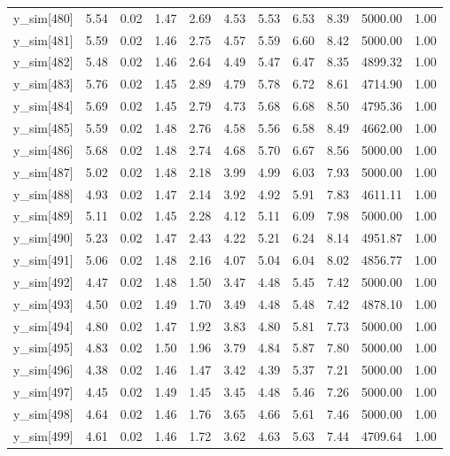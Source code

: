 \begin{table}[ht]
\begin{tabular}{rrrrrrrrrrr}
  y\_sim[480] & 5.54 & 0.02 & 1.47 & 2.69 & 4.53 & 5.53 & 6.53 & 8.39 & 5000.00 & 1.00 \\ 
  y\_sim[481] & 5.59 & 0.02 & 1.46 & 2.75 & 4.57 & 5.59 & 6.60 & 8.42 & 5000.00 & 1.00 \\ 
  y\_sim[482] & 5.48 & 0.02 & 1.46 & 2.64 & 4.49 & 5.47 & 6.47 & 8.35 & 4899.32 & 1.00 \\ 
  y\_sim[483] & 5.76 & 0.02 & 1.45 & 2.89 & 4.79 & 5.78 & 6.72 & 8.61 & 4714.90 & 1.00 \\ 
  y\_sim[484] & 5.69 & 0.02 & 1.45 & 2.79 & 4.73 & 5.68 & 6.68 & 8.50 & 4795.36 & 1.00 \\ 
  y\_sim[485] & 5.59 & 0.02 & 1.48 & 2.76 & 4.58 & 5.56 & 6.58 & 8.49 & 4662.00 & 1.00 \\ 
  y\_sim[486] & 5.68 & 0.02 & 1.48 & 2.74 & 4.68 & 5.70 & 6.67 & 8.56 & 5000.00 & 1.00 \\ 
  y\_sim[487] & 5.02 & 0.02 & 1.48 & 2.18 & 3.99 & 4.99 & 6.03 & 7.93 & 5000.00 & 1.00 \\ 
  y\_sim[488] & 4.93 & 0.02 & 1.47 & 2.14 & 3.92 & 4.92 & 5.91 & 7.83 & 4611.11 & 1.00 \\ 
  y\_sim[489] & 5.11 & 0.02 & 1.45 & 2.28 & 4.12 & 5.11 & 6.09 & 7.98 & 5000.00 & 1.00 \\ 
  y\_sim[490] & 5.23 & 0.02 & 1.47 & 2.43 & 4.22 & 5.21 & 6.24 & 8.14 & 4951.87 & 1.00 \\ 
  y\_sim[491] & 5.06 & 0.02 & 1.48 & 2.16 & 4.07 & 5.04 & 6.04 & 8.02 & 4856.77 & 1.00 \\ 
  y\_sim[492] & 4.47 & 0.02 & 1.48 & 1.50 & 3.47 & 4.48 & 5.45 & 7.42 & 5000.00 & 1.00 \\ 
  y\_sim[493] & 4.50 & 0.02 & 1.49 & 1.70 & 3.49 & 4.48 & 5.48 & 7.42 & 4878.10 & 1.00 \\ 
  y\_sim[494] & 4.80 & 0.02 & 1.47 & 1.92 & 3.83 & 4.80 & 5.81 & 7.73 & 5000.00 & 1.00 \\ 
  y\_sim[495] & 4.83 & 0.02 & 1.50 & 1.96 & 3.79 & 4.84 & 5.87 & 7.80 & 5000.00 & 1.00 \\ 
  y\_sim[496] & 4.38 & 0.02 & 1.46 & 1.47 & 3.42 & 4.39 & 5.37 & 7.21 & 5000.00 & 1.00 \\ 
  y\_sim[497] & 4.45 & 0.02 & 1.49 & 1.45 & 3.45 & 4.48 & 5.46 & 7.26 & 5000.00 & 1.00 \\ 
  y\_sim[498] & 4.64 & 0.02 & 1.46 & 1.76 & 3.65 & 4.66 & 5.61 & 7.46 & 5000.00 & 1.00 \\ 
  y\_sim[499] & 4.61 & 0.02 & 1.46 & 1.72 & 3.62 & 4.63 & 5.63 & 7.44 & 4709.64 & 1.00 \\ 

\end{tabular}
\end{table}
